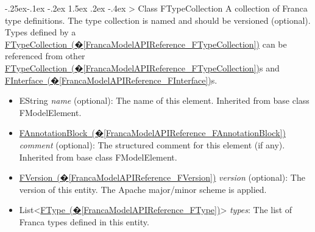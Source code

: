 \documentclass[a4paper,10pt]{scrreprt}
\makeatletter
\renewcommand\subsection{\medskip\@startsection{subsection}{2}{\z@}%
  {-.25ex\@plus -.1ex \@minus -.2ex}%
  {1.5ex \@plus .2ex \@minus -.4ex}%
  {\ifnum \scr@compatibility>\@nameuse{scr@v@2.96}\relax
    \setlength{\parfillskip}{\z@ plus 1fil}\fi
    \raggedsection\normalfont\sectfont\nobreak\size@subsection
  }%
}
\newlength{\XdocItemIndent}
\makeatother
\begin{document}
\subsection{Class FTypeCollection}
\label{FrancaModelAPIReference_FTypeCollection}
A collection of Franca type definitions.
The type collection is named and should be versioned (optional).
Types defined by a \hyperref[FrancaModelAPIReference_FTypeCollection]{FTypeCollection~(�\ref*{FrancaModelAPIReference_FTypeCollection})} can be referenced from
other \hyperref[FrancaModelAPIReference_FTypeCollection]{FTypeCollection~(�\ref*{FrancaModelAPIReference_FTypeCollection})}s and \hyperref[FrancaModelAPIReference_FInterface]{FInterface~(�\ref*{FrancaModelAPIReference_FInterface})}s.
\setlength{\XdocItemIndent}{\textwidth}
\begin{itemize}
\addtolength{\XdocItemIndent}{-2.5em}
\item \begin{minipage}[t]{\XdocItemIndent}
EString \textit{name} (optional): The name of this element.
		 Inherited from base class FModelElement.

\end{minipage}
\item \begin{minipage}[t]{\XdocItemIndent}
\hyperref[FrancaModelAPIReference_FAnnotationBlock]{FAnnotationBlock~(�\ref*{FrancaModelAPIReference_FAnnotationBlock})} \textit{comment} (optional): The structured comment for this element (if any).
		 Inherited from base class FModelElement.

\end{minipage}
\item \begin{minipage}[t]{\XdocItemIndent}
\hyperref[FrancaModelAPIReference_FVersion]{FVersion~(�\ref*{FrancaModelAPIReference_FVersion})} \textit{version} (optional): The version of this entity. The Apache major/minor scheme is applied.

\end{minipage}
\item \begin{minipage}[t]{\XdocItemIndent}
List<\hyperref[FrancaModelAPIReference_FType]{FType~(�\ref*{FrancaModelAPIReference_FType})}> \textit{types}: The list of Franca types defined in this entity.

\end{minipage}
\end{itemize}
\addtolength{\XdocItemIndent}{2.5em}
\end{document}
